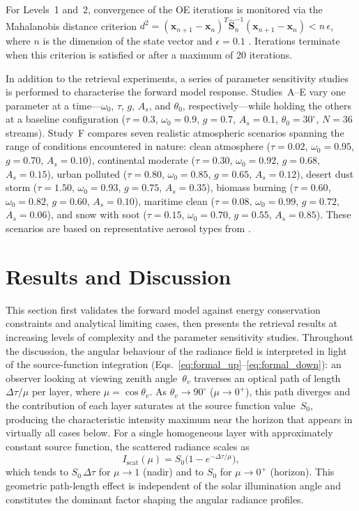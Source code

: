 \documentclass[a4paper, 11pt]{article}
\begin{document}
For Levels~1 and~2, convergence of the OE iterations is monitored via
the Mahalanobis distance criterion
$d^2 = (\mathbf{x}_{n+1} - \mathbf{x}_n)^T
\hat{\mathbf{S}}_n^{-1}(\mathbf{x}_{n+1} - \mathbf{x}_n) < n\,\epsilon$,
where $n$ is the dimension of the state vector and $\epsilon = 0.1$
\cite{rodgers2000}.  Iterations terminate when this criterion is
satisfied or after a maximum of 20 iterations.

In addition to the retrieval experiments, a series of parameter
sensitivity studies is performed to characterise the forward model
response.  Studies~A--E vary one parameter at a time---$\omega_0$,
$\tau$, $g$, $A_s$, and $\theta_0$, respectively---while holding the
others at a baseline configuration ($\tau=0.3$, $\omega_0=0.9$,
$g=0.7$, $A_s=0.1$, $\theta_0=30^{\circ}$, $N=36$ streams).
Study~F compares seven realistic atmospheric scenarios spanning
the range of conditions encountered in nature:
clean atmosphere ($\tau=0.02$, $\omega_0=0.95$, $g=0.70$, $A_s=0.10$),
continental moderate ($\tau=0.30$, $\omega_0=0.92$, $g=0.68$, $A_s=0.15$),
urban polluted ($\tau=0.80$, $\omega_0=0.85$, $g=0.65$, $A_s=0.12$),
desert dust storm ($\tau=1.50$, $\omega_0=0.93$, $g=0.75$, $A_s=0.35$),
biomass burning ($\tau=0.60$, $\omega_0=0.82$, $g=0.60$, $A_s=0.10$),
maritime clean ($\tau=0.08$, $\omega_0=0.99$, $g=0.72$, $A_s=0.06$),
and snow with soot ($\tau=0.15$, $\omega_0=0.70$, $g=0.55$, $A_s=0.85$).
These scenarios are based on representative aerosol types from
\cite{hess1998,seinfeld2016}.

\section{Results and Discussion}
\label{sec:results}

This section first validates the forward model against energy
conservation constraints and analytical limiting cases, then presents
the retrieval results at increasing levels of complexity and the
parameter sensitivity studies.  Throughout the discussion, the angular
behaviour of the radiance field is interpreted in light of the
source-function integration
(Eqs.~\ref{eq:formal_up}--\ref{eq:formal_down}): an observer looking
at viewing zenith angle~$\theta_v$ traverses an optical path of length
$\Delta\tau/\mu$ per layer, where $\mu = \cos\theta_v$.  As $\theta_v
\to 90^{\circ}$ ($\mu \to 0^+$), this path diverges and the
contribution of each layer saturates at the source function value~$S_0$,
producing the characteristic intensity maximum near the horizon that
appears in virtually all cases below.  For a single homogeneous layer
with approximately constant source function, the scattered radiance
scales as
\begin{equation}
  I_{\text{scat}}(\mu) = S_0\bigl(1 - e^{-\Delta\tau/\mu}\bigr),
  \label{eq:horizon_saturation}
\end{equation}
which tends to $S_0\,\Delta\tau$ for $\mu \to 1$ (nadir) and to $S_0$
for $\mu \to 0^+$ (horizon).  This geometric path-length effect is
independent of the solar illumination angle and constitutes the
dominant factor shaping the angular radiance profiles.
\end{document}
